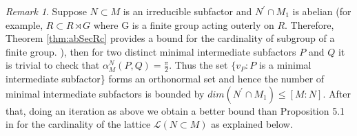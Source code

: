 \documentclass[11pt,letterpaper]{amsart}
\theoremstyle{definition}
\theoremstyle{remark}
\newtheorem{remark}[theorem]{Remark}
\begin{document}
 \begin{remark}
  Suppose $N\subset M$ is an irreducible subfactor and $N^\prime\cap M_1$ is abelian (for example, $R\subset R\rtimes G$ where G is a finite group acting outerly on $R$. Therefore, Theorem \ref{thm:abSecRc} provides a bound for the cardinality of subgroup of a finite group. ), then  for two distinct minimal intermediate subfactors
  $P$ and $Q$ it is trivial to check that $\alpha_M^N(P,Q)=\frac{\pi}{2}$. Thus the set $\{v_P: P$ is a minimal intermediate subfactor\} forms an orthonormal set and hence
  the number of minimal intermediate subfactors is bounded by $dim(N^{\prime}\cap M_1)  \leq [M:N].$  After that, doing an iteration as above we  obtain a better bound than
 Proposition 5.1 in \cite{TW} for the cardinality of the lattice $\mathcal{L}(N\subset M)$ as explained below.
 \end{remark}
\end{document}
